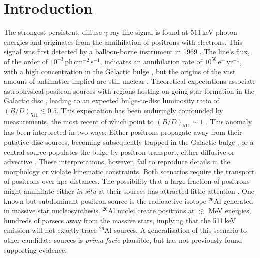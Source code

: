 \documentclass[doublespace,draft,nopageskip]{VTthesis} %
\newcommand{\mrm}[1]{\mathrm{#1}}
\newcommand{\nuc}[2]{$\mrm{^{#2}#1}$}
\begin{document}
	\section{Introduction}\label{sec:intro}
	The strongest persistent, diffuse $\gamma$-ray line signal is found at 511\,keV photon energies and originates from the annihilation of positrons with electrons.
	This signal was first detected by a balloon-borne instrument in 1969 \citep{Johnson1973_511}.
	The line's	flux, of the order of $10^{-3}\,\mathrm{ph\,cm^{-2}\,s^{-1}}$, indicates an annihilation rate of $10^{50}\,\mathrm{e^+\,yr^{-1}}$, with a high concentration in the Galactic bulge \citep{Purcell1997_511,Knoedlseder2005_511}, but the origins of the vast amount of antimatter implied are still unclear \citep{Prantzos2011_511}.
	Theoretical expectations associate astrophysical positron sources with regions hosting on-going star formation in the Galactic disc \citep[e.g.,][]{Alexis2014_511ISM}, leading to an expected bulge-to-disc luminosity ratio of $(B/D)_{511} \lesssim 0.5$.
	This expectation has been enduringly confounded by measurements, the most recent of which point to $(B/D)_{511} \sim 1$ \citep{Siegert2016_511}.
	This anomaly has been interpreted in two ways: 
	Either positrons propagate away from their putative disc sources, becoming subsequently trapped in the Galactic bulge \citep[e.g.,][]{Prantzos2006_511,Higdon2009_511}, or a central source populates the bulge by positron transport, either diffusive \citep{Jean2009_511ISM,Martin2012_511,Alexis2014_511ISM} or advective \citep{Jean2009_511ISM,Crocker2011_FB,Panther2018_nuclear_outflow,Churazov2011_511}.
	These interpretations, however, fail to reproduce details in the morphology or violate kinematic constraints.
	Both scenarios require the transport of positrons over $\mathrm{kpc}$ distances. 
	The possibility that a large fraction of positrons might annihilate either \textit{in situ} at their sources has attracted little attention \citep[e.g.,][]{Martin2010_SN511}.
	One known but subdominant positron source is the radioactive isotope \nuc{Al}{26} generated in massive star nucleosynthesis.
	 \nuc{Al}{26} nuclei create positrons at $\lesssim$ MeV energies, hundreds of parsecs away from the massive stars, implying that the 511\,keV emission will not exactly trace \nuc{Al}{26} sources.
	A generalisation of this scenario to other candidate sources is \textit{prima facie} plausible, but has not previously found supporting evidence.
	
\end{document}
